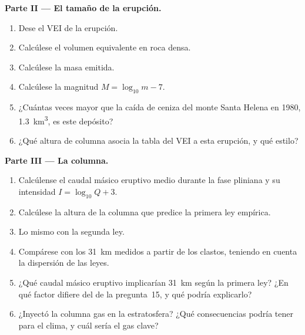 \begin{problem}
\noindent\textbf{Parte II --- El tamaño de la erupción.}
\begin{enumerate}[resume]
\item Dese el VEI de la erupción.
\item Calcúlese el volumen equivalente en roca densa.
\item Calcúlese la masa emitida.
\item Calcúlese la magnitud $M = \log_{10}m - 7$.
\item ¿Cuántas veces mayor que la caída de ceniza del monte Santa Helena en 1980,
\qty{1.3}{km^3}, es este depósito?
\item ¿Qué altura de columna asocia la tabla del VEI a esta erupción, y
qué estilo?
\end{enumerate}

\noindent\textbf{Parte III --- La columna.}
\begin{enumerate}[resume]
\item Calcúlense el caudal másico eruptivo medio durante la fase pliniana y su
intensidad $I = \log_{10}Q + 3$.
\item Calcúlese la altura de la columna que predice la primera ley empírica.
\item Lo mismo con la segunda ley.
\item Compárese con los \qty{31}{km} medidos a partir de los clastos, teniendo en cuenta la dispersión
de las leyes.
\item ¿Qué caudal másico eruptivo implicarían \qty{31}{km} según la primera ley? ¿En qué
factor difiere del de la pregunta~15, y qué podría explicarlo?
\item ¿Inyectó la columna gas en la estratosfera? ¿Qué consecuencias podría tener para el
clima, y cuál sería el gas clave?
\end{enumerate}


\end{problem}
